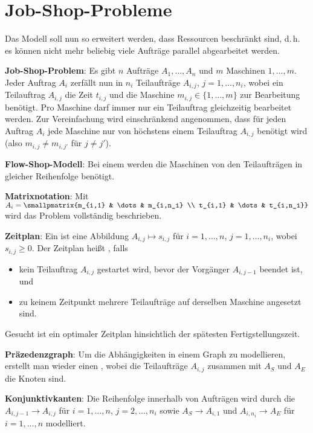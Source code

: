 \pagebreak

\section{%
    Job-Shop-Probleme%
}

Das Modell soll nun so erweitert werden, dass Ressourcen beschränkt sind,
d.\,h. es können nicht mehr beliebig viele Aufträge parallel abgearbeitet werden.

\textbf{Job-Shop-Problem}:
Es gibt $n$ Aufträge $A_1, \dotsc, A_n$
und $m$ Maschinen $1, \dotsc, m$.
Jeder Auftrag $A_i$ zerfällt nun in $n_i$ Teilaufträge $A_{i,j}$, $j = 1, \dotsc, n_i$,
wobei ein Teilauftrag $A_{i,j}$ die Zeit $t_{i,j}$ und
die Maschine $m_{i,j} \in \{1, \dotsc, m\}$ zur Bearbeitung benötigt.
Pro Maschine darf immer nur ein Teilauftrag gleichzeitig bearbeitet werden.
Zur Vereinfachung wird einschränkend angenommen, dass für jeden Auftrag $A_i$
jede Maschine nur von höchstens einem Teilauftrag $A_{i,j}$ benötigt wird
(also $m_{i,j} \not= m_{i,j'}$ für $j \not= j'$).

\textbf{Flow-Shop-Modell}:
Bei einem  werden die Maschinen von den Teilaufträgen in gleicher
Reihenfolge benötigt.

\textbf{Matrixnotation}:
Mit $A_i = \smallpmatrix{m_{i,1} & \dots & m_{i,n_i} \\ t_{i,1} & \dots & t_{i,n_i}}$
wird das Problem vollständig beschrieben.

\textbf{Zeitplan}:
Ein  ist eine Abbildung $A_{i,j} \mapsto s_{i,j}$ für
$i = 1, \dotsc, n$, $j = 1, \dotsc, n_i$, wobei $s_{i,j} \ge 0$.
Der Zeitplan heißt , falls
\begin{itemize}
    \item
    kein Teilauftrag $A_{i,j}$ gestartet wird, bevor der Vorgänger $A_{i,j-1}$ beendet ist, und

    \item
    zu keinem Zeitpunkt mehrere Teilaufträge auf derselben Maschine angesetzt sind.
\end{itemize}
Gesucht ist ein optimaler Zeitplan hinsichtlich der spätesten Fertigstellungszeit.

\linie

\textbf{Präzedenzgraph}:
Um die Abhängigkeiten in einem Graph zu modellieren, erstellt man wieder einen
, wobei die Teilaufträge $A_{i,j}$ zusammen mit $A_S$ und $A_E$
die Knoten sind.

\textbf{Konjunktivkanten}:
Die Reihenfolge innerhalb von Aufträgen wird durch die 
$A_{i,j-1} \to A_{i,j}$ für $i = 1, \dotsc, n$, $j = 2, \dotsc, n_i$
sowie $A_S \to A_{i,1}$ und $A_{i,n_i} \to A_E$ für $i = 1, \dotsc, n$ modelliert.

